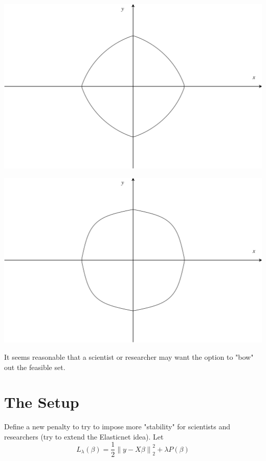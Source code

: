 \documentclass[10pt, reqno]{article}
\numberwithin{equation}{section}
\newcommand{\norm}[1]{\left\lVert#1\right\rVert}
\begin{document}
\vspace{.5cm}
\begin{center}
\begin{minipage}{.5\textwidth}
  \centering
  \includegraphics[width=.9\linewidth]{elasticnet.png}
\end{minipage}%
\begin{minipage}{.5\textwidth}
  \centering
  \includegraphics[width=.9\linewidth]{new_penalty_4_moment.png}
\end{minipage}
\end{center}
\vspace{.5cm}

It seems reasonable that a scientist or researcher may want the option to "bow" out the feasible set.

\newpage
\section*{The Setup}

Define a new penalty to try to impose more "stability" for scientists and researchers (try to extend the Elasticnet idea). Let
\[
L_{\lambda}(\beta) = \frac{1}{2} \norm{y - X \beta}_2^2 + \lambda P(\beta)
\]
\end{document}
